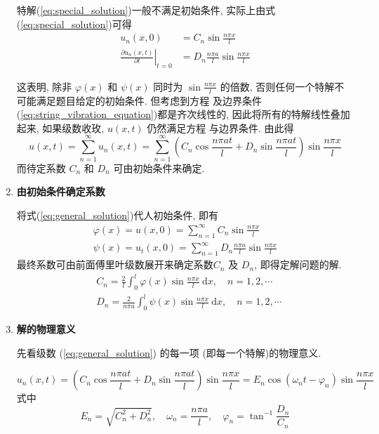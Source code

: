 \begin{enumerate}
    特解(\ref{eq:special_solution})一般不满足初始条件, 实际上由式(\ref{eq:special_solution})可得 
    $$
    \begin{aligned}
    u_{n}(x, 0) & =C_{n} \sin \frac{n \pi x}{l} \\
    \left.\frac{\partial u_{n}(x, t)}{\partial t}\right|_{t=0} & =D_{n} \frac{n \pi a}{l} \sin \frac{n \pi x}{l}
    \end{aligned}
    $$

    这表明, 除非 $\varphi(x)$ 和 $\psi(x)$ 同时为 $\sin \frac{n \pi x}{l}$ 的倍数,
     否则任何一个特解不可能满足题目给定的初始条件. 
     但考虑到方程  及边界条件(\ref{eq:string_vibration_equation})都是齐次线性的, 
     因此将所有的特解线性叠加起来, 如果级数收玫, $u(x, t)$ 仍然满足方程 与边界条件. 由此得
    \begin{equation}
        u(x, t)=\sum_{n=1}^{\infty} u_{n}(x, t)=
        \sum_{n=1}^{\infty}\left(C_{n} \cos \frac{n \pi a t}{l}+
        D_{n} \sin \frac{n \pi a t}{l}\right) \sin \frac{n \pi x}{l}
        \label{eq:general_solution}
    \end{equation}
    而待定系数 $C_{n}$ 和 $D_{n}$ 可由初始条件来确定.
    

    \item \textbf{由初始条件确定系数} 
    
        将式(\ref{eq:general_solution})代人初始条件, 即有
        $$
        \begin{gathered}
        \varphi(x)=u(x, 0)=\sum_{n=1}^{\infty} C_{n} \sin \frac{n \pi x}{l} \\
        \psi(x)=u_{t}(x, 0)=\sum_{n=1}^{\infty} D_{n} \frac{n \pi a}{l} \sin \frac{n \pi x}{l}
        \end{gathered}
        $$
        最终系数可由前面傅里叶级数展开来确定系数$C_{n}$ 及 $D_{n}$, 即得定解问题的解.
        $$
        \begin{aligned}
        & C_{n}=\frac{2}{l} \int_{0}^{l} \varphi(x) \sin \frac{n \pi x}{l} \mathrm{~d} x, \quad n=1,2, \cdots \\
        & D_{n}=\frac{2}{n \pi a} \int_{0}^{l} \psi(x) \sin \frac{n \pi x}{l} \mathrm{~d} x, \quad n=1,2, \cdots
        \end{aligned}
        $$


        \item \textbf{解的物理意义}
        
        先看级数 (\ref{eq:general_solution}) 的每一项 (即每一个特解)的物理意义.

        \begin{equation}
            u_{n}(x, t)=\left(C_{n} \cos \frac{n \pi a t}{l}+D_{n} \sin \frac{n \pi a t}{l}\right) \sin \frac{n \pi x}{l}
            =E_{n} \cos \left(\omega_{n} t-\varphi_{n}\right) \sin \frac{n \pi x}{l}
            \label{eq:solution_2}
        \end{equation}    
        式中
        $$
        E_{n}=\sqrt{C_{n}^{2}+D_{n}^{2}}, 
            \quad \omega_{n}=\frac{n \pi a}{l}, 
            \quad \varphi_{n}=\tan ^{-1} \frac{D_{n}}{C_{n}}
        $$
        

\end{enumerate}
